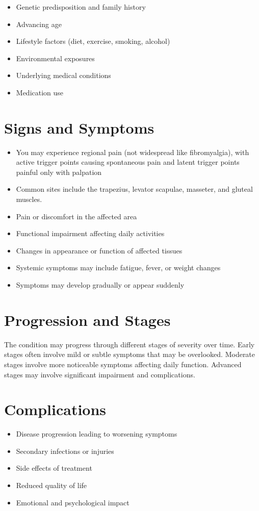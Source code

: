 \begin{itemize}[noitemsep]
  \item Genetic predisposition and family history
  \item Advancing age
  \item Lifestyle factors (diet, exercise, smoking, alcohol)
  \item Environmental exposures
  \item Underlying medical conditions
  \item Medication use
\end{itemize}
\section{Signs and Symptoms}
\begin{itemize}[noitemsep]
  \item You may experience regional pain (not widespread like fibromyalgia), with active trigger points causing spontaneous pain and latent trigger points painful only with palpation
  \item Common sites include the trapezius, levator scapulae, masseter, and gluteal muscles.
  \item Pain or discomfort in the affected area
  \item Functional impairment affecting daily activities
  \item Changes in appearance or function of affected tissues
  \item Systemic symptoms may include fatigue, fever, or weight changes
  \item Symptoms may develop gradually or appear suddenly
\end{itemize}
\section{Progression and Stages}
The condition may progress through different stages of severity over time. Early stages often involve mild or subtle symptoms that may be overlooked. Moderate stages involve more noticeable symptoms affecting daily function. Advanced stages may involve significant impairment and complications.
\section{Complications}
\begin{itemize}[noitemsep]
  \item Disease progression leading to worsening symptoms
  \item Secondary infections or injuries
  \item Side effects of treatment
  \item Reduced quality of life
  \item Emotional and psychological impact
\end{itemize}
